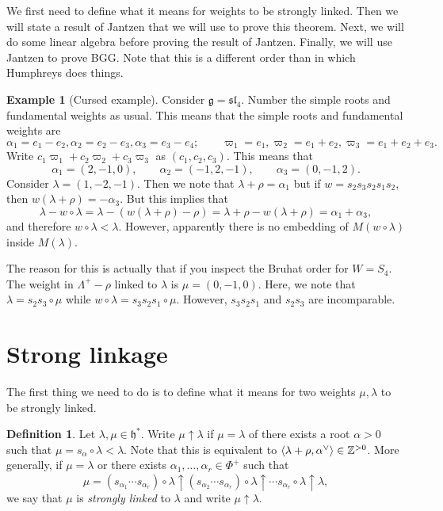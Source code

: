 \documentclass[leqno, openany]{memoir}
\theoremstyle{definition}
\newtheorem{defn}[thm]{Definition}
\newtheorem{exm}[thm]{Example}
\theoremstyle{remark}
\theoremstyle{plain}
\theoremstyle{definition}
\theoremstyle{remark}
\newcommand{\Z}{\mathbb{Z}}
\newcommand{\g}{\mathfrak{g}}
\newcommand{\h}{\mathfrak{h}}
\newcommand{\mf}[1]{\mathfrak{#1}}
\begin{document}
We first need to define what it means for weights to be strongly linked. Then we will state a result of Jantzen that we will use to prove this theorem. Next, we will do some linear algebra before proving the result of Jantzen. Finally, we will use Jantzen to prove BGG. Note that this is a different order than in which Humphreys does things.

\begin{exm}[Cursed example]
  Consider $\g = \mf{sl}_4$. Number the simple roots and fundamental weights as usual. This means that the simple roots and fundamental weights are
  \[ \alpha_1 = e_1 - e_2, \alpha_2 = e_2 - e_3, \alpha_3 = e_3 - e_4; \qquad \varpi_1 = e_1, \varpi_2 = e_1 + e_2, \varpi_3 = e_1 + e_2 + e_3. \]
  Write $c_1 \varpi_1 + c_2 \varpi_2 + c_3 \varpi_3$ as $(c_1, c_2, c_3)$. This means that
  \[\alpha_1 = (2,-1,0), \qquad \alpha_2 = (-1,2,-1), \qquad \alpha_3 = (0, -1, 2). \]
  Consider $\lambda = (1, -2, -1)$. Then we note that $\lambda + \rho = \alpha_1$ but if $w = s_2 s_3 s_2 s_1 s_2$, then $w(\lambda + \rho) = - \alpha_3$. But this implies that
  \[ \lambda - w \circ \lambda = \lambda - (w(\lambda + \rho) - \rho) = \lambda + \rho - w(\lambda + \rho) = \alpha_1 + \alpha_3, \]
  and therefore $w \circ \lambda < \lambda$. However, apparently there is no embedding of $M(w \circ \lambda)$ inside $M(\lambda)$.

  The reason for this is actually that if you inspect the Bruhat order for $W = S_4$. The weight in $\Lambda^+ - \rho$ linked to $\lambda$ is $\mu = (0, -1, 0)$. Here, we note that $\lambda = s_2 s_3 \circ \mu$ while $w \circ \lambda = s_3 s_2 s_1 \circ \mu$. However, $s_3 s_2 s_1$ and $s_2 s_3$ are incomparable.
\end{exm}

\section{Strong linkage}
\label{sec:strong_linkage}

The first thing we need to do is to define what it means for two weights $\mu, \lambda$ to be strongly linked.

\begin{defn}
  Let $\lambda, \mu \in \h^{*}$. Write $\mu \uparrow \lambda$ if $\mu = \lambda$ of there exists a root $\alpha > 0$ such that $\mu = s_{\alpha} \circ \lambda < \lambda$. Note that this is equivalent to $\ev{\lambda + \rho, \alpha^{\vee}} \in \Z^{>0}$. More generally, if $\mu = \lambda$ or there exists $\alpha_{1}, \ldots, \alpha_{r} \in \Phi^{+}$ such that
  \[ \mu = (s_{\alpha_{1}} \cdots s_{\alpha_{r}}) \circ \lambda \uparrow (s_{\alpha_{2}} \cdots s_{\alpha_{r}}) \circ \lambda \uparrow \cdots s_{\alpha_{r}} \circ \lambda \uparrow \lambda, \]
  we say that $\mu$ is \textit{strongly linked} to $\lambda$ and write $\mu \uparrow \lambda$.
\end{defn}
\end{document}
